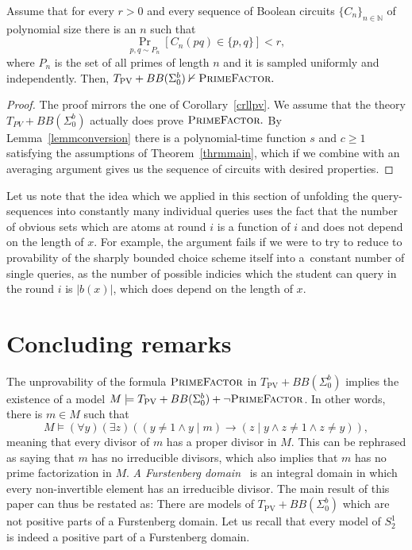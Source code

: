 \documentclass{lmcs}
\newcommand{\PV}{\text{PV}}
\newcommand{\abs}[1]{\lvert #1\rvert}
\newcommand{\PrimeFactor}{\textsc{PrimeFactor}}
\newcommand{\NN}{\mathbb{N}}
\begin{document}
\begin{thm}\label{thrmpvbb}
    Assume that for every $r>0$ and every sequence of Boolean circuits $\{C_n\}_{n\in\NN}$ of polynomial size there is an $n$ such that
    \[\Pr_{p,q\sim P_n}[C_n(pq) \in \{p,q\}] < r,\]
    where $P_n$ is the set of all primes of length $n$ and it is sampled uniformly and independently. Then,
    $T_{\PV} + BB(\Sigma^b_0) \nvdash \PrimeFactor.$
\end{thm}
\begin{proof}
    The proof mirrors the one of Corollary~\ref{crllpv}. We assume that the theory $T_{PV}+BB(\Sigma^b_0)$ actually does prove $\PrimeFactor.$ By Lemma~\ref{lemmconversion} there is a polynomial-time function $s$ and $c\geq 1$ satisfying the assumptions of Theorem~\ref{thrmmain}, which if we combine with an averaging argument gives us the sequence of circuits with desired properties.
\end{proof}

Let us note that the idea which we applied in this section of unfolding the query-sequences into constantly many individual queries uses the fact that the number of obvious sets which are atoms at round $i$ is a function of $i$ and does not depend on the length of $x$. For example, the argument fails if we were to try to reduce to provability of the sharply bounded choice scheme itself into a~constant number of single queries, as the number of possible indicies which the student can query in the round $i$ is $\abs{b(x)}$, which does depend on the length of $x$.

\section{Concluding remarks}\label{secconcl}

The unprovability of the formula $\PrimeFactor$ in $T_{\PV}+ BB(\Sigma^b_0)$ implies the existence of a model
$M \models T_{\PV} + BB(\Sigma^b_0)+\lnot \PrimeFactor$. In other words, there is $m\in M$ such that
\[M\models (\forall y)(\exists z)((y \neq 1 \land y\mid m) \to (z\mid y \land z\neq 1 \land z\neq y)),\]
meaning that every divisor of $m$ has a proper divisor in $M$. This can be rephrased as saying that $m$ has no irreducible divisors, which also implies that $m$ has no prime factorization in $M$. \emph{A Furstenberg domain}~\cite{clark2017} is an integral domain in which every non-invertible element has an irreducible divisor. The main result of this paper can thus be restated as: There are models of $T_{\PV}+BB(\Sigma^b_0)$ which are not positive parts of a Furstenberg domain. Let us recall that every model of $S^1_2$ is indeed a positive part of a Furstenberg domain.
\end{document}
